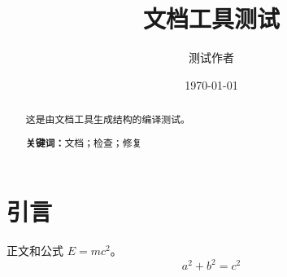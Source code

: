 \documentclass[UTF8,a4paper,12pt]{ctexart}
\title{文档工具测试}
\author{测试作者}
\date{\today}
\begin{document}
\maketitle
\begin{abstract}
这是由文档工具生成结构的编译测试。

\noindent\textbf{关键词：}文档；检查；修复
\end{abstract}
\tableofcontents
\section{引言}
正文和公式 $E=mc^2$。
\begin{equation}
  a^2+b^2=c^2
\end{equation}
\end{document}
